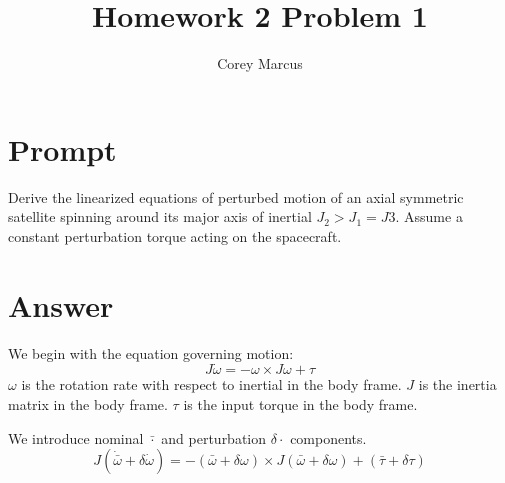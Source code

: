 \documentclass[]{article}
\title{Homework 2 Problem 1}
\author{Corey Marcus}
\begin{document}
\maketitle

\newcommand{\CrossProd}[1]{\left[ #1 \times \right]}

\section{Prompt}

Derive the linearized equations of perturbed motion of an axial symmetric satellite spinning around its major axis of inertial $J_2 > J_1 = J3$. Assume a constant perturbation torque acting on the spacecraft.

\section{Answer}

We begin with the equation governing motion:
\begin{equation}
	J \dot{\omega} = -\omega \times J \omega + \tau
\end{equation}
$\omega$ is the rotation rate with respect to inertial in the body frame. $J$ is the inertia matrix in the body frame. $\tau$ is the input torque in the body frame.

We introduce nominal $\bar{\cdot}$ and perturbation $\delta \cdot $ components.
\begin{equation}
	J \left(\dot{\bar{\omega}} + \delta \dot{\omega} \right) = -\left(\bar{\omega} + \delta \omega \right) \times J \left(\bar{\omega} + \delta \omega \right) + \left(\bar{\tau} + \delta \tau \right)
\end{equation}
\end{document}

